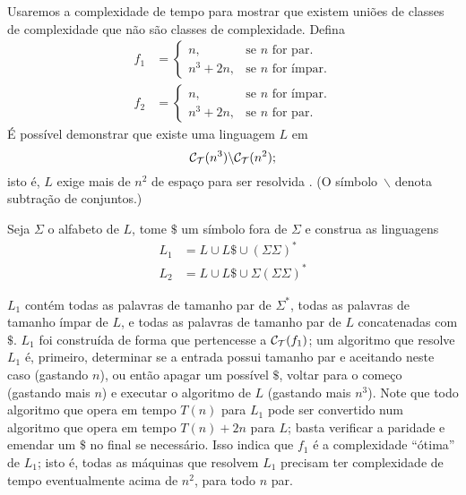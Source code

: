 \begin{counterexample}
    Usaremos a complexidade de tempo para mostrar que
    existem uniões de classes de complexidade
    que não são classes de complexidade.
    Defina
    \begin{align*}
        f_1 & = \begin{cases}
                    n, & \text{se $n$ for par.} \\
                    n^3 + 2n, & \text{se $n$ for ímpar.}
                \end{cases} \\
        f_2 & = \begin{cases}
                    n, & \text{se $n$ for ímpar.} \\
                    n^3 + 2n, & \text{se $n$ for par.}
                \end{cases}
    \end{align*}
    É possível demonstrar que existe uma linguagem $L$ em
    \begin{equation*}
        \mathcal C_{\mathcal{T}}(n^3) \backslash \mathcal C_{\mathcal{T}}(n^2);
    \end{equation*}
    isto é, $L$ exige mais de $n^2$ de espaço para ser resolvida
    \cite[p.~299]{HopcroftUllman1979}.
    (O símbolo~$\backslash$ denota subtração de conjuntos.)

    Seja $\Sigma$ o alfabeto de $L$,
    tome $\$$ um símbolo fora de $\Sigma$
    e construa as linguagens
    \begin{align*}
        L_1 &= L \cup L\$ \cup ( \Sigma \Sigma )^* \\
        L_2 &= L \cup L\$ \cup \Sigma ( \Sigma \Sigma )^*
    \end{align*}

    $L_1$ contém todas as palavras de tamanho par de $\Sigma^*$,
    todas as palavras de tamanho ímpar de $L$,
    e todas as palavras de tamanho par de $L$ concatenadas com $\$$.
    $L_1$ foi construída de forma que pertencesse
    a $\mathcal C_{\mathcal{T}}(f_1)$;
    um algoritmo que resolve $L_1$
    é, primeiro, determinar se a entrada possui tamanho par
    e aceitando neste caso
    (gastando $n$),
    ou então apagar um possível $\$$,
    voltar para o começo
    (gastando mais $n$)
    e executar o algoritmo de $L$
    (gastando mais $n^3$).
    Note que todo algoritmo que opera em tempo $T(n)$
    para $L_1$
    pode ser convertido num algoritmo que opera em tempo
    $T(n) + 2n$ para $L$;
    basta verificar a paridade e emendar um $\$$ no final
    se necessário.
    Isso indica que $f_1$ é a complexidade ``ótima''
    de $L_1$;
    isto é,
    todas as máquinas que resolvem $L_1$
    precisam ter complexidade de tempo
    eventualmente acima de $n^2$,
    para todo $n$ par.


\end{counterexample}
